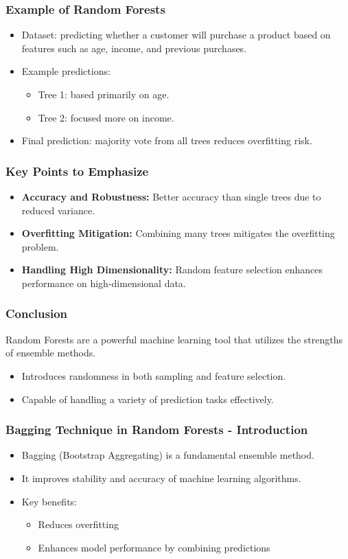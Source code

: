 \documentclass[aspectratio=169]{beamer}
\begin{document}
\begin{frame}[fragile]
    \frametitle{Example of Random Forests}
    \begin{itemize}
        \item Dataset: predicting whether a customer will purchase a product based on features such as age, income, and previous purchases.
        \item Example predictions:
        \begin{itemize}
            \item Tree 1: based primarily on age.
            \item Tree 2: focused more on income.
        \end{itemize}
        \item Final prediction: majority vote from all trees reduces overfitting risk.
    \end{itemize}
\end{frame}

\begin{frame}[fragile]
    \frametitle{Key Points to Emphasize}
    \begin{itemize}
        \item \textbf{Accuracy and Robustness:} Better accuracy than single trees due to reduced variance.
        \item \textbf{Overfitting Mitigation:} Combining many trees mitigates the overfitting problem.
        \item \textbf{Handling High Dimensionality:} Random feature selection enhances performance on high-dimensional data.
    \end{itemize}
\end{frame}

\begin{frame}[fragile]
    \frametitle{Conclusion}
    Random Forests are a powerful machine learning tool that utilizes the strengths of ensemble methods.
    \begin{itemize}
        \item Introduces randomness in both sampling and feature selection.
        \item Capable of handling a variety of prediction tasks effectively.
    \end{itemize}
\end{frame}

\begin{frame}[fragile]
    \frametitle{Bagging Technique in Random Forests - Introduction}
    \begin{itemize}
        \item Bagging (Bootstrap Aggregating) is a fundamental ensemble method.
        \item It improves stability and accuracy of machine learning algorithms.
        \item Key benefits:
        \begin{itemize}
            \item Reduces overfitting
            \item Enhances model performance by combining predictions
        \end{itemize}
    \end{itemize}
\end{frame}
\end{document}
